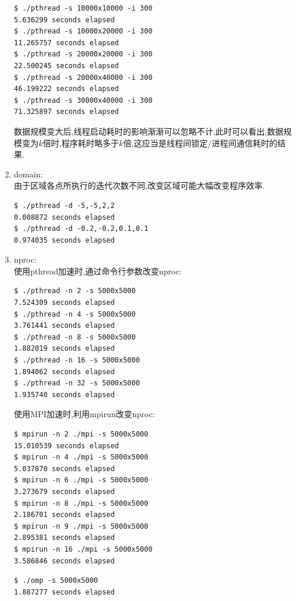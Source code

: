 \begin{enumerate}
\begin{lstlisting}
$ ./pthread -s 10000x10000 -i 300
5.636299 seconds elapsed
$ ./pthread -s 10000x20000 -i 300
11.265757 seconds elapsed
$ ./pthread -s 20000x20000 -i 300
22.500245 seconds elapsed
$ ./pthread -s 20000x40000 -i 300
46.199222 seconds elapsed
$ ./pthread -s 30000x40000 -i 300
71.325897 seconds elapsed
\end{lstlisting}

数据规模变大后,线程启动耗时的影响渐渐可以忽略不计,此时可以看出,数据规模变为$ k$倍时,程序耗时略多于$ k$倍,这应当是线程间锁定/进程间通信耗时的结果.

\item domain:\\
	由于区域各点所执行的迭代次数不同,改变区域可能大幅改变程序效率.

\begin{lstlisting}
$ ./pthread -d -5,-5,2,2
0.008872 seconds elapsed
$ ./pthread -d -0.2,-0.2,0.1,0.1   
0.974035 seconds elapsed
\end{lstlisting}

\item nproc:\\
	使用pthread加速时,通过命令行参数改变nproc:
\begin{lstlisting}
$ ./pthread -n 2 -s 5000x5000
7.524309 seconds elapsed
$ ./pthread -n 4 -s 5000x5000                                                                                                                                                                                                                  
3.761441 seconds elapsed
$ ./pthread -n 8 -s 5000x5000
1.882019 seconds elapsed
$ ./pthread -n 16 -s 5000x5000
1.894062 seconds elapsed
$ ./pthread -n 32 -s 5000x5000
1.935740 seconds elapsed
\end{lstlisting}
	使用MPI加速时,利用mpirun改变nproc:
\begin{lstlisting}
$ mpirun -n 2 ./mpi -s 5000x5000
15.010539 seconds elapsed
$ mpirun -n 4 ./mpi -s 5000x5000
5.037870 seconds elapsed
$ mpirun -n 6 ./mpi -s 5000x5000
3.273679 seconds elapsed
$ mpirun -n 8 ./mpi -s 5000x5000
2.186701 seconds elapsed
$ mpirun -n 9 ./mpi -s 5000x5000
2.895381 seconds elapsed
$ mpirun -n 16 ./mpi -s 5000x5000
3.586846 seconds elapsed
\end{lstlisting}

\begin{lstlisting}
$ ./omp -s 5000x5000
1.887277 seconds elapsed
\end{lstlisting}



\end{enumerate}
